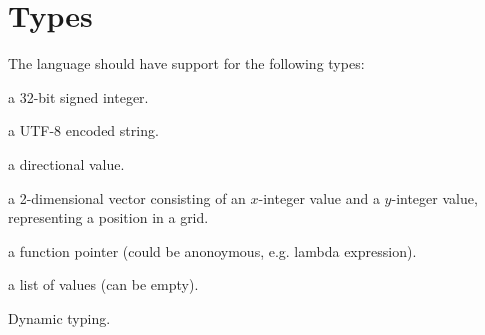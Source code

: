 \section{Types}

The language should have support for the following types:

\begin{description}[noitemsep]
\item[Integer] a 32-bit signed integer.
\item[String] a UTF-8 encoded string.
\item[Direction] a directional value.
\item[Coordinate] a 2-dimensional vector consisting of an $x$-integer value and
a $y$-integer value, representing a position in a grid.
\item[Function] a function pointer (could be anonoymous, e.g. lambda expression).
\item[List] a list of values (can be empty).
\end{description}

Dynamic typing.



